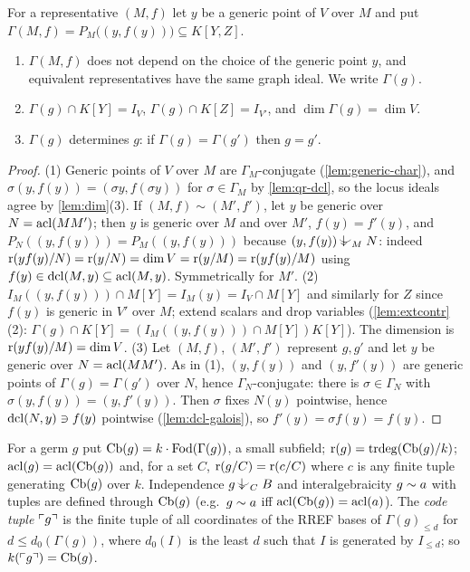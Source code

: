 \begin{definition}\label{def:graph}
For a representative $(M,f)$ let $y$ be a generic point of $V$ over $M$ and put
$\Gamma(M,f)=P_M\bigl((y,f(y))\bigr)\subseteq K[Y,Z]$.
\end{definition}

\begin{lemma}\label{lem:graph}
\begin{enumerate}[nosep]
\item $\Gamma(M,f)$ does not depend on the choice of the generic point $y$, and
  equivalent representatives have the same graph ideal.  We write $\Gamma(g)$.
\item $\Gamma(g)\cap K[Y]=I_V$, $\Gamma(g)\cap K[Z]=I_{V'}$, and $\dim\Gamma(g)=\dim V$.
\item $\Gamma(g)$ determines $g$: if $\Gamma(g)=\Gamma(g')$ then $g=g'$.
\end{enumerate}
\end{lemma}
\begin{proof}
(1) Generic points of $V$ over $M$ are $\Gamma_M$-conjugate (\cref{lem:generic-char}),
and $\sigma(y,f(y))=(\sigma y,f(\sigma y))$ for $\sigma\in\Gamma_M$ by \cref{lem:qr-dcl},
so the locus ideals agree by \cref{lem:dim}(3).  If $(M,f)\sim(M',f')$, let $y$ be
generic over $N=\operatorname{acl}(MM')$; then $y$ is generic over $M$ and over $M'$,
$f(y)=f'(y)$, and $P_N((y,f(y)))=P_M((y,f(y)))$ because $(y,f(y))\ind{M}N$:
indeed $\operatorname{r}(yf(y)/N)=\operatorname{r}(y/N)=\dim V=\operatorname{r}(y/M)=\operatorname{r}(yf(y)/M)$ using
$f(y)\in\operatorname{dcl}(M,y)\subseteq\operatorname{acl}(M,y)$.  Symmetrically for $M'$.
(2) $I_M((y,f(y)))\cap M[Y]=I_M(y)=I_V\cap M[Y]$ and similarly for $Z$ since $f(y)$ is
generic in $V'$ over $M$; extend scalars and drop variables
(\cref{lem:extcontr}(2): $\Gamma(g)\cap K[Y]=(I_M((y,f(y)))\cap M[Y])K[Y]$).  The
dimension is $\operatorname{r}(yf(y)/M)=\dim V$.
(3) Let $(M,f)$, $(M',f')$ represent $g,g'$ and let $y$ be generic over $N=\operatorname{acl}(MM')$.
As in (1), $(y,f(y))$ and $(y,f'(y))$ are generic points of $\Gamma(g)=\Gamma(g')$
over $N$, hence $\Gamma_N$-conjugate: there is $\sigma\in\Gamma_N$ with
$\sigma(y,f(y))=(y,f'(y))$.  Then $\sigma$ fixes $N(y)$ pointwise, hence
$\operatorname{dcl}(N,y)\ni f(y)$ pointwise (\cref{lem:dcl-galois}), so $f'(y)=\sigma f(y)=f(y)$.
\end{proof}

\begin{definition}\label{def:germcode}
For a germ $g$ put $\operatorname{Cb}(g)=k\cdot\operatorname{Fod}(\Gamma(g))$, a small subfield;
$\operatorname{r}(g)=\operatorname{trdeg}(\operatorname{Cb}(g)/k)$; $\operatorname{acl}(g)=\operatorname{acl}(\operatorname{Cb}(g))$ and, for a set $C$,
$\operatorname{r}(g/C)=\operatorname{r}(c/C)$ where $c$ is any finite tuple generating $\operatorname{Cb}(g)$ over $k$.
Independence $g\ind{C}B$ and interalgebraicity $g\sim a$ with tuples are defined
through $\operatorname{Cb}(g)$ (e.g.\ $g\sim a$ iff $\operatorname{acl}(\operatorname{Cb}(g))=\operatorname{acl}(a)$).  The
\emph{code tuple} $\ulcorner g\urcorner$ is the finite tuple of all coordinates of the RREF bases
of $\Gamma(g)_{\le d}$ for $d\le d_0(\Gamma(g))$, where $d_0(I)$ is the least $d$ such
that $I$ is generated by $I_{\le d}$; so $k(\ulcorner g\urcorner)=\operatorname{Cb}(g)$.
\end{definition}

